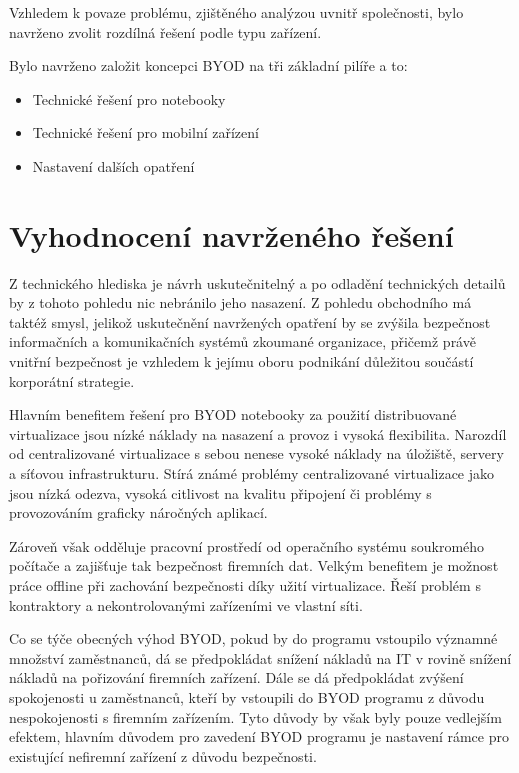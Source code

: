 
Vzhledem k povaze problému, zjištěného analýzou uvnitř společnosti, bylo navrženo zvolit rozdílná řešení podle typu zařízení.

Bylo navrženo založit koncepci BYOD na tři základní pilíře a to:

\begin{itemize}
    \item Technické řešení pro notebooky
    \item Technické řešení pro mobilní zařízení
    \item Nastavení dalších opatření
\end{itemize}


\section{Vyhodnocení navrženého řešení}
Z technického hlediska je návrh uskutečnitelný a po odladění technických detailů by z tohoto pohledu nic nebránilo jeho nasazení. Z pohledu obchodního má taktéž smysl, jelikož uskutečnění navržených opatření by se zvýšila bezpečnost informačních a komunikačních systémů zkoumané organizace, přičemž právě vnitřní bezpečnost je vzhledem k jejímu oboru podnikání důležitou součástí korporátní strategie. 

Hlavním benefitem řešení pro BYOD notebooky za použití distribuované virtualizace jsou nízké náklady na nasazení a provoz i vysoká flexibilita. Narozdíl od centralizované virtualizace s sebou nenese vysoké náklady na úložiště, servery a síťovou infrastrukturu. Stírá známé problémy centralizované virtualizace jako jsou nízká odezva, vysoká citlivost na kvalitu připojení či problémy s provozováním graficky náročných aplikací.

Zároveň však odděluje pracovní prostředí od operačního systému soukromého počítače a zajišťuje tak bezpečnost firemních dat. Velkým benefitem je možnost práce offline při zachování bezpečnosti díky užití virtualizace. Řeší problém s kontraktory a nekontrolovanými zařízeními ve vlastní síti.

Co se týče obecných výhod BYOD, pokud by do programu vstoupilo významné množství zaměstnanců, dá se předpokládat snížení nákladů na IT v rovině snížení nákladů na pořizování firemních zařízení. Dále se dá předpokládat zvýšení spokojenosti u zaměstnanců, kteří by vstoupili do BYOD programu z důvodu nespokojenosti s firemním zařízením. Tyto důvody by však byly pouze vedlejším efektem, hlavním důvodem pro zavedení BYOD programu je nastavení rámce pro existující nefiremní zařízení z důvodu bezpečnosti.


